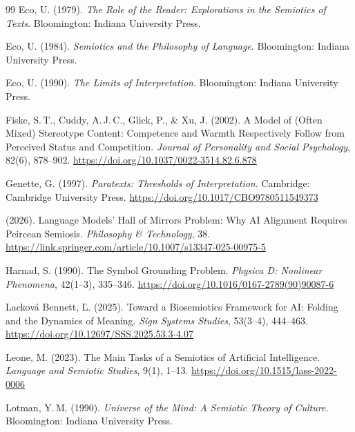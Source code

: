 \documentclass[12pt,a4paper]{article}
\begin{document}
\begin{thebibliography}{99}
Eco, U. (1979).
\newblock \emph{The Role of the Reader: Explorations in the Semiotics of Texts}.
\newblock Bloomington: Indiana University Press.

Eco, U. (1984).
\newblock \emph{Semiotics and the Philosophy of Language}.
\newblock Bloomington: Indiana University Press.

Eco, U. (1990).
\newblock \emph{The Limits of Interpretation}.
\newblock Bloomington: Indiana University Press.

Fiske, S.\,T., Cuddy, A.\,J.\,C., Glick, P., \& Xu, J. (2002).
\newblock A Model of (Often Mixed) Stereotype Content: Competence and Warmth
Respectively Follow from Perceived Status and Competition.
\newblock \emph{Journal of Personality and Social Psychology}, 82(6), 878--902.
\newblock \url{https://doi.org/10.1037/0022-3514.82.6.878}

Genette, G. (1997).
\newblock \emph{Paratexts: Thresholds of Interpretation}.
\newblock Cambridge: Cambridge University Press.
\newblock \url{https://doi.org/10.1017/CBO9780511549373}

(2026).
\newblock Language Models' Hall of Mirrors Problem: Why AI Alignment Requires
Peircean Semiosis.
\newblock \emph{Philosophy \& Technology}, 38.
\newblock \url{https://link.springer.com/article/10.1007/s13347-025-00975-5}

Harnad, S. (1990).
\newblock The Symbol Grounding Problem.
\newblock \emph{Physica D: Nonlinear Phenomena}, 42(1--3), 335--346.
\newblock \url{https://doi.org/10.1016/0167-2789(90)90087-6}

Lackov\'a Bennett, \v{L}. (2025).
\newblock Toward a Biosemiotics Framework for AI: Folding and the Dynamics
of Meaning.
\newblock \emph{Sign Systems Studies}, 53(3--4), 444--463.
\newblock \url{https://doi.org/10.12697/SSS.2025.53.3-4.07}

Leone, M. (2023).
\newblock The Main Tasks of a Semiotics of Artificial Intelligence.
\newblock \emph{Language and Semiotic Studies}, 9(1), 1--13.
\newblock \url{https://doi.org/10.1515/lass-2022-0006}

Lotman, Y.\,M. (1990).
\newblock \emph{Universe of the Mind: A Semiotic Theory of Culture}.
\newblock Bloomington: Indiana University Press.


\end{thebibliography}
\end{document}
